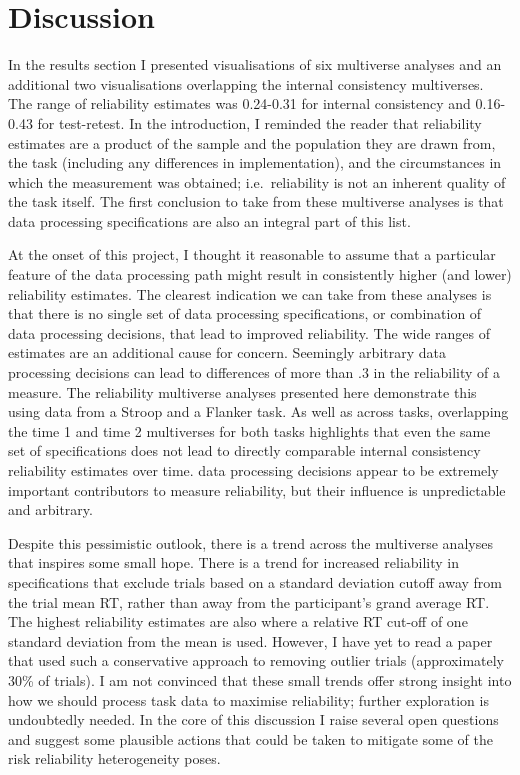 \documentclass[english,man,floatsintext]{apa6}
\begin{document}
\hypertarget{discussion}{%
\section{Discussion}\label{discussion}}

In the results section I presented visualisations of six multiverse analyses and an additional two visualisations overlapping the internal consistency multiverses. The range of reliability estimates was 0.24-0.31 for internal consistency and 0.16-0.43 for test-retest. In the introduction, I reminded the reader that reliability estimates are a product of the sample and the population they are drawn from, the task (including any differences in implementation), and the circumstances in which the measurement was obtained; i.e.~reliability is not an inherent quality of the task itself. The first conclusion to take from these multiverse analyses is that data processing specifications are also an integral part of this list.

At the onset of this project, I thought it reasonable to assume that a particular feature of the data processing path might result in consistently higher (and lower) reliability estimates. The clearest indication we can take from these analyses is that there is no single set of data processing specifications, or combination of data processing decisions, that lead to improved reliability. The wide ranges of estimates are an additional cause for concern. Seemingly arbitrary data processing decisions can lead to differences of more than .3 in the reliability of a measure. The reliability multiverse analyses presented here demonstrate this using data from a Stroop and a Flanker task. As well as across tasks, overlapping the time 1 and time 2 multiverses for both tasks highlights that even the same set of specifications does not lead to directly comparable internal consistency reliability estimates over time. data processing decisions appear to be extremely important contributors to measure reliability, but their influence is unpredictable and arbitrary.

Despite this pessimistic outlook, there is a trend across the multiverse analyses that inspires some small hope. There is a trend for increased reliability in specifications that exclude trials based on a standard deviation cutoff away from the trial mean RT, rather than away from the participant's grand average RT. The highest reliability estimates are also where a relative RT cut-off of one standard deviation from the mean is used. However, I have yet to read a paper that used such a conservative approach to removing outlier trials (approximately 30\% of trials). I am not convinced that these small trends offer strong insight into how we should process task data to maximise reliability; further exploration is undoubtedly needed. In the core of this discussion I raise several open questions and suggest some plausible actions that could be taken to mitigate some of the risk reliability heterogeneity poses.
\end{document}
